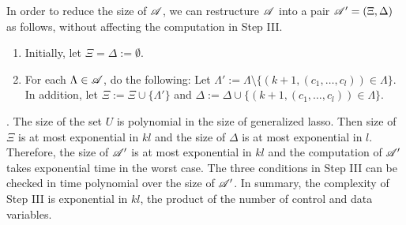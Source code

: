 In order to reduce the size of $\mathscr{A}$, we can restructure $\mathscr{A}$ into a pair $\mathscr{A}'=(\Xi, \Delta)$ as follows, without affecting the computation in Step III.
\begin{enumerate}
\item Initially, let $\Xi = \Delta := \emptyset$.
\item For each $\Lambda \in \mathscr{A}$, do the following: Let $\Lambda' := \Lambda \setminus \{(k+1, (c_1, \dots, c_l)) \in \Lambda\}$. In addition, let $\Xi := \Xi \cup \{\Lambda'\}$ and $\Delta:= \Delta \cup \{(k+1, (c_1,\dots, c_l)) \in \Lambda\}$. 
\end{enumerate}

. The size of the set $U$ is polynomial in the size of generalized lasso. Then size of $\Xi$ is at most exponential in $kl$ and the size of $\Delta$ is at most exponential in $l$. Therefore, the size of $\mathscr{A}'$ is at most exponential in $kl$ and the computation of $\mathscr{A}'$ takes exponential time in the worst case. The three conditions in Step III can be checked in time polynomial over the size of $\mathscr{A}'$. In summary, the complexity of Step III is exponential in $kl$, the product of the number of control and data variables.

